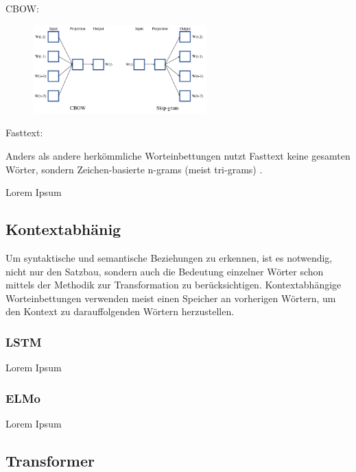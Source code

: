 CBOW:

\begin{figure}[H]
    \centering
    \includegraphics[width=0.6\textwidth]{data/images/materials_and_methods/cbow_skip_gram.png}
    \caption{\autocite[8]{kowsari_text_2019}}
    \label{fig:cbow_skip_gram}
\end{figure}

Fasttext:

Anders als andere herkömmliche Worteinbettungen nutzt Fasttext keine gesamten Wörter, sondern Zeichen-basierte n-grams (meist tri-grams) \autocite[9]{kowsari_text_2019}.

Lorem Ipsum

\subsection{Kontextabhänig}

Um syntaktische und semantische Beziehungen zu erkennen, ist es notwendig, nicht nur den Satzbau, sondern auch die Bedeutung einzelner Wörter schon mittels der Methodik zur Transformation zu berücksichtigen. Kontextabhängige Worteinbettungen verwenden meist einen Speicher an vorherigen Wörtern, um den Kontext zu darauffolgenden Wörtern herzustellen.

\subsubsection*{LSTM}

Lorem Ipsum

\subsubsection*{ELMo}

Lorem Ipsum

\subsection{Transformer}


